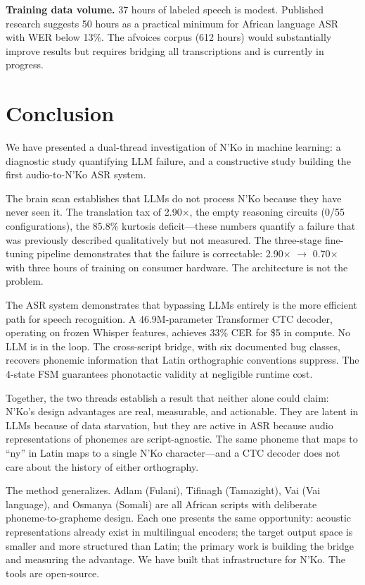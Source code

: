 \documentclass[11pt]{article}
\begin{document}
\textbf{Training data volume.}
37 hours of labeled speech is modest.
Published research \cite{data_scaling_2024} suggests 50 hours as a practical minimum for African language ASR with WER below 13\%.
The afvoices corpus (612 hours) would substantially improve results but requires bridging all transcriptions and is currently in progress.

\section{Conclusion}

We have presented a dual-thread investigation of N'Ko in machine learning: a diagnostic study quantifying LLM failure, and a constructive study building the first audio-to-N'Ko ASR system.

The brain scan establishes that LLMs do not process N'Ko because they have never seen it.
The translation tax of 2.90$\times$, the empty reasoning circuits (0/55 configurations), the 85.8\% kurtosis deficit---these numbers quantify a failure that was previously described qualitatively but not measured.
The three-stage fine-tuning pipeline demonstrates that the failure is correctable: 2.90$\times$ $\to$ 0.70$\times$ with three hours of training on consumer hardware.
The architecture is not the problem.

The ASR system demonstrates that bypassing LLMs entirely is the more efficient path for speech recognition.
A 46.9M-parameter Transformer CTC decoder, operating on frozen Whisper features, achieves 33\% CER for \$5 in compute.
No LLM is in the loop.
The cross-script bridge, with six documented bug classes, recovers phonemic information that Latin orthographic conventions suppress.
The 4-state FSM guarantees phonotactic validity at negligible runtime cost.

Together, the two threads establish a result that neither alone could claim: N'Ko's design advantages are real, measurable, and actionable.
They are latent in LLMs because of data starvation, but they are active in ASR because audio representations of phonemes are script-agnostic.
The same phoneme that maps to ``ny'' in Latin maps to a single N'Ko character---and a CTC decoder does not care about the history of either orthography.

The method generalizes.
Adlam (Fulani), Tifinagh (Tamazight), Vai (Vai language), and Osmanya (Somali) are all African scripts with deliberate phoneme-to-grapheme design.
Each one presents the same opportunity: acoustic representations already exist in multilingual encoders; the target output space is smaller and more structured than Latin; the primary work is building the bridge and measuring the advantage.
We have built that infrastructure for N'Ko.
The tools are open-source.
\end{document}
